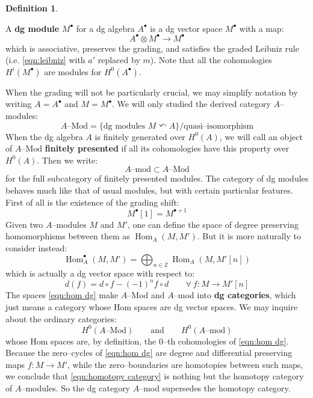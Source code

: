 \documentclass[12pt]{amsart}
\numberwithin{equation}{section}
\theoremstyle{definition}
\newtheorem{definition}[theorem]{Definition}
\theoremstyle{remark}
\DeclareMathOperator{\Hom}{Hom}
\newcommand{\ZZ}{\mathbb{Z}}
\renewcommand{\1}{\mathbf{1}}
\begin{document}
\begin{definition}
\label{def:dg module}

A \textbf{dg module} $M^\bullet$ for a dg algebra $A^\bullet$ is a dg vector space  $M^\bullet$ with a map:
$$
A^\bullet \otimes M^\bullet \longrightarrow M^\bullet
$$
which is associative, preserves the grading, and satisfies the graded Leibniz rule (i.e. \eqref{eqn:leibniz} with $a'$ replaced by $m$). Note that all the cohomologies $H^i(M^\bullet)$ are modules for $H^0(A^\bullet)$. 

\end{definition}

When the grading will not be particularly crucial, we may simplify notation by writing $A = A^\bullet$ and $M = M^\bullet$. We will only studied the derived category $A$--modules:
$$
A\text{--Mod} = \Big\{\text{dg modules }M \curvearrowleft A \Big\}/\text{quasi--isomorphism}
$$
When the dg algebra $A$ is finitely generated over $H^0(A)$, we will call an object of $A\text{--Mod}$ \textbf{finitely presented} if all its cohomologies have this property over $H^0(A)$. Then we write:
$$
A\text{--mod} \subset A\text{--Mod}
$$
for the full subcategory of finitely presented modules. The category of dg modules behaves much like that of usual modules, but with certain particular features. First of all is the existence of the grading shift:
$$
M^\bullet[1] = M^{\bullet+1}
$$
Given two $A$--modules $M$ and $M'$, one can define the space of degree preserving homomorphisms between them as $\Hom_A(M,M')$. But it is more naturally to consider instead:
\begin{equation}
\label{eqn:hom dg}
\Hom^\bullet_A(M,M') = \bigoplus_{n\in \ZZ} \Hom_A(M,M'[n])
\end{equation}
which is actually a dg vector space with respect to:
$$
d(f) = d \circ f - (-1)^n f \circ d \qquad \forall \ f:M \rightarrow M'[n]
$$
The spaces \eqref{eqn:hom dg} make $A$--Mod and $A$--mod into \textbf{dg categories}, which just means a category whose Hom spaces are dg vector spaces. We may inquire about the ordinary categories:
\begin{equation}
\label{eqn:homotopy category}
H^0(A\text{--Mod}) \qquad \text{and} \qquad H^0(A\text{--mod})
\end{equation}
whose Hom spaces are, by definition, the 0--th cohomologies of \eqref{eqn:hom dg}. Because the zero--cycles of \eqref{eqn:hom dg} are degree and differential preserving maps $f:M \rightarrow M'$, while the zero--boundaries are homotopies between such maps, we conclude that \eqref{eqn:homotopy category} is nothing but the homotopy category of $A$--modules. So the dg category $A$--mod supersedes the homotopy category.
\end{document}
